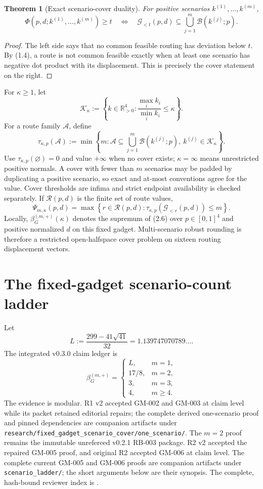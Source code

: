 \documentclass[11pt]{article}
\newtheorem{theorem}{Theorem}[section]
\theoremstyle{remark}
\newcommand{\R}{\mathbb{R}}
\newcommand{\good}{\mathcal{G}}
\newcommand{\bad}{\mathcal{B}}
\newcommand{\K}{\mathcal{K}}
\begin{document}
\begin{theorem}[Exact scenario-cover duality]\label{thm:duality}
For positive scenarios $k^{(1)},\ldots,k^{(m)}$,
\[
\Phi(p,d;k^{(1)},\ldots,k^{(m)})\ge t
\quad\Longleftrightarrow\quad
\good_{<t}(p,d)\subseteq\bigcup_{j=1}^m\bad(k^{(j)};p).
\tag{2.3}
\]
\end{theorem}

\begin{proof}
The left side says that no common feasible routing has deviation below $t$.
By (1.4), a route is not common feasible exactly when at least one scenario
has negative dot product with its displacement. This is precisely the cover
statement on the right.
\end{proof}

For $\kappa\ge1$, let
\[
\K_\kappa:=\left\{k\in\R^4_{>0}:
\frac{\max_i k_i}{\min_i k_i}\le\kappa\right\}.
\tag{2.4}
\]
For a route family $\mathcal A$, define
\[
\tau_{\kappa,p}(\mathcal A):=
\min\left\{m:\mathcal A\subseteq\bigcup_{j=1}^m\bad(k^{(j)};p),
\ k^{(j)}\in\K_\kappa\right\}.
\tag{2.5}
\]
Use $\tau_{\kappa,p}(\varnothing)=0$ and value $+\infty$ when no cover exists;
$\kappa=\infty$ means unrestricted positive normals. A cover with fewer than
$m$ scenarios may be padded by duplicating a positive scenario, so exact and
at-most conventions agree for the value. Cover thresholds are infima and
strict endpoint availability is checked separately.
If $\mathcal R(p,d)$ is the finite set of route values,
\[
\Psi_{m,\kappa}(p,d)=
\max\left\{r\in\mathcal R(p,d):
\tau_{\kappa,p}(\good_{<r}(p,d))\le m\right\}.
\tag{2.6}
\]
Locally, $\beta_G^{(m,+)}(\kappa)$ denotes the supremum of (2.6) over
$p\in[0,1]^4$ and positive normalized $d$ on this fixed gadget.
Multi-scenario robust rounding is therefore a restricted open-halfspace cover
problem on sixteen routing displacement vectors.

\section{The fixed-gadget scenario-count ladder}

Let
\[
L:=\frac{299-41\sqrt{41}}{32}=1.139747070789\ldots.
\tag{3.1}
\]
The integrated v0.3.0 claim ledger is
\[
\boxed{
\beta_G^{(m,+)}=
\begin{cases}
L,&m=1,\\
17/8,&m=2,\\
3,&m=3,\\
4,&m\ge4.
\end{cases}}
\tag{3.2}
\]
The evidence is modular. R1 v2 accepted GM-002 and GM-003 at claim level while
its packet retained editorial repairs; the complete derived one-scenario proof
and pinned dependencies are companion artifacts under
\texttt{research/fixed\_gadget\_scenario\_cover/one\_scenario/}. The $m=2$
proof remains the immutable unrefereed v0.2.1 RB-003 package. R2 v2 accepted
the repaired GM-005 proof, and original R2 accepted GM-006 at claim level. The
complete current GM-005 and GM-006 proofs are companion artifacts under
\texttt{scenario\_ladder/}; the short arguments below are their synopsis.
The complete, hash-bound reviewer index is
.
\end{document}
